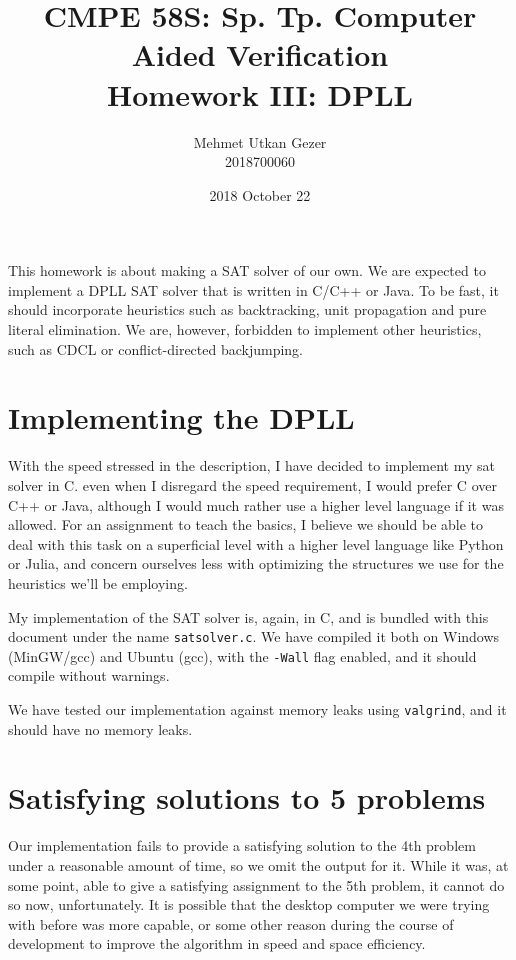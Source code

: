 \documentclass{article}
\title{CMPE 58S: Sp. Tp. Computer Aided Verification \\ Homework III: DPLL}
\date{2018 October 22}
\author{Mehmet Utkan Gezer \\ 2018700060}
\begin{document}
\maketitle

This homework is about making a SAT solver of our own.
We are expected to implement a DPLL SAT solver that is
written in C/C++ or Java. To be fast, it should incorporate
heuristics such as backtracking, unit propagation and
pure literal elimination. We are, however, forbidden to
implement other heuristics, such as CDCL or
conflict-directed backjumping.

\section{Implementing the DPLL}

With the speed stressed in the description, I have decided
to implement my sat solver in C. even when I disregard the
speed requirement, I would prefer C over C++ or Java,
although I would much rather use a higher level language
if it was allowed. For an assignment to teach the basics,
I believe we should be able to deal with this task on a
superficial level with a higher level language like
Python or Julia, and concern ourselves less with optimizing
the structures we use for the heuristics we'll be employing.

My implementation of the SAT solver is, again, in C, and
is bundled with this document under the name
\texttt{satsolver.c}. We have compiled it both on
Windows (MinGW/gcc) and Ubuntu (gcc), with the
\texttt{-Wall} flag enabled, and it should compile
without warnings.

We have tested our implementation against memory
leaks using \texttt{valgrind}, and it should have no
memory leaks.

\section{Satisfying solutions to 5 problems}

Our implementation fails to provide a satisfying
solution to the 4th problem under a reasonable amount
of time, so we omit the output for it. While it was,
at some point, able to give a satisfying assignment
to the 5th problem, it cannot do so now, unfortunately.
It is possible that the desktop computer we were trying
with before was more capable, or some other reason
during the course of development to improve the
algorithm in speed and space efficiency.
\end{document}
